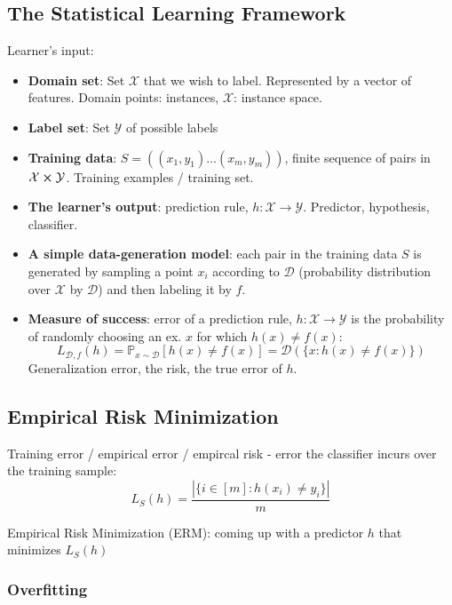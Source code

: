 \subsection{The Statistical Learning Framework}

Learner's input:
\begin{itemize}
    \item \textbf{Domain set}: Set $\mathcal{X}$ that we wish to label. Represented by a vector of features. Domain points: instances, $\mathcal{X}$: instance space.
    \item \textbf{Label set}: Set $\mathcal{Y}$ of possible labels
    \item \textbf{Training data}: $S = ((x_1, y_1) \dots (x_m, y_m))$, finite sequence of pairs in $\mathcal{X} \cross \mathcal{Y}$. Training examples / training set.
    \item \textbf{The learner's output}: prediction rule, $h : \mathcal{X} \rightarrow \mathcal{Y}$. Predictor, hypothesis, classifier.
    \item \textbf{A simple data-generation model}: each pair in the training data $S$ is generated by sampling a point $x_i$ according to $\mathcal{D}$ (probability distribution over $\mathcal{X}$ by $\mathcal{D}$) and then labeling it by $f$.
    \item \textbf{Measure of success}: error of a prediction rule, $h : \mathcal{X} \rightarrow \mathcal{Y}$ is the probability of randomly choosing an ex. $x$ for which $h(x) \neq f(x)$:
    $$L_{\mathcal{D}, f}(h) = \mathbb{P}_{x \sim \mathcal{D}} [h(x) \neq f(x)] = \mathcal{D}(\{x:h(x) \neq f(x)\})$$
    Generalization error, the risk, the true error of $h$.

\end{itemize}

\subsection{Empirical Risk Minimization}

Training error / empirical error / empircal risk - error the classifier incurs over the training sample: $$L_S(h) = \frac{|\{i \in [m] : h(x_i) \neq y_i \}|}{m}$$

Empirical Risk Minimization (ERM): coming up with a predictor $h$ that minimizes $L_S(h)$

\subsubsection{Overfitting}

